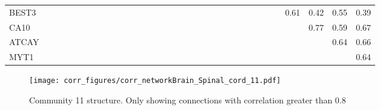 \begin{longtable}{lrrrrrrrrrrrrrrrrrrrrrrrrrrrrrrrr}
BEST3   &             &               &             &            &            &              &            &             &               &             &              &             &            &               &             &              &             &              &             &              &               &             &              &             &           &             &              &             &       0.61 &        0.42 &       0.55 &        0.39 \\
CA10    &             &               &             &            &            &              &            &             &               &             &              &             &            &               &             &              &             &              &             &              &               &             &              &             &           &             &              &             &            &        0.77 &       0.59 &        0.67 \\
ATCAY   &             &               &             &            &            &              &            &             &               &             &              &             &            &               &             &              &             &              &             &              &               &             &              &             &           &             &              &             &            &             &       0.64 &        0.66 \\
MYT1    &             &               &             &            &            &              &            &             &               &             &              &             &            &               &             &              &             &              &             &              &               &             &              &             &           &             &              &             &            &             &            &        0.64 \\
\end{longtable}


\begin{figure}[h!]
\centering
\texttt{[image: corr\_figures/corr\_networkBrain\_Spinal\_cord\_11.pdf]}
\caption{Community 11 structure. Only showing connections with correlation greater than 0.8}
\end{figure}




